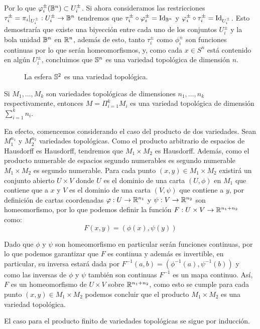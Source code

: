 \begin{example}[$n-$Esfera]
	Por lo que $\phi_i^{\pm}(\B^n) \subset U_{i}^{\pm}$. Si ahora consideramos las restricciones $\tau_i^{\pm} = \pi_i |_{U_i^{\pm}}: U_i^{\pm} \to \B^n$ tendremos que $\tau_i^{\pm} \circ \phi_i^{\pm} = \id_{\B^n}$ y $\phi_i^{\pm} \circ \tau_i^{\pm} = \id_{U_i^{\pm}}$. Esto demostraría que existe una biyección entre cada uno de los conjuntos $U_i^{\pm}$ y la bola unidad $\B^n$ en $\R^n$, además de esto, tanto $\tau_i^{\pm}$ como $\phi_i^{\pm}$ son funciones continuas por lo que serán homeomorfismos, y, como cada $x \in S^n$ está contenido en algún $U_i^{\pm}$, concluimos que $\S^n$ es una variedad topológica de dimensión $n$.
\end{example}

\begin{figure}[h!]
	\centering
	
	\caption{La esfera $\S^{2}$ es una variedad topológica.}
\end{figure}

\begin{example}\label{Ex: Variedad Topologica - Producto de Variedades}
	Si $M_1, \hdots, M_k$ son variedades topológicas de dimensiones $n_1,\hdots,n_k$ respectivamente, entonces $M = \Pi_{i=1}^k M_i$ es una variedad topológica de dimensión $\sum_{i=1}^k n_i$.

	En efecto, comencemos considerando el caso del producto de dos variedades. Sean $M_{1}^{n_1}$ y $M_{2}^{n_2}$ variedades topológicas. Como el producto arbitrario de espacios de Hausdorff es Hausdorff, tendremos que $M_1 \times M_2$ es Hausdorff. Además, como el producto numerable de espacios segundo numerables es segundo numerable $M_1 \times M_2$ es segundo numerable.
	Para cada punto $(x,y) \in M_1 \times M_2$ existirá un conjunto abierto $U \times V$ donde $U$ es el dominio de una carta $(U,\phi)$ en $M_1$ que contiene que a $x$ y $V$ es el dominio de una carta $(V,\psi)$ que contiene a $y$, por definición de cartas coordenadas $\phi: U \to \R^{n_1}$ y $\psi: V \to \R^{n_2}$ son homeomorfismo, por lo que podemos definir la función $F: U \times V \to \R^{n_1 + n_2}$ como:
	\[
		F(x,y) = (\phi(x),\psi(y))
	\]

	Dado que $\phi$ y $\psi$ son homeomorfismo en particular serán funciones continuas, por lo que podemos garantizar que $F$ es continua y además es invertible, en particular, su inversa estará dada por $F^{-1}(a,b) = (\phi^{-1}(a),\psi^{-1}(b))$ y como las inversas de $\phi$  y $\psi$ también son continuas $F^{-1}$ es un mapa continuo. Así, $F$ es un homeomorfismo de $U \times V$ sobre $\R^{n_1 + n_2}$, como esto se cumple para cada punto $(x,y) \in M_1 \times M_2$ podemos concluir que el producto $M_1 \times M_2$ es una variedad topológica.

	El caso para el producto finito de variedades topológicas se sigue por inducción.
\end{example}

